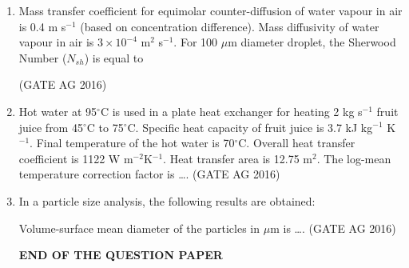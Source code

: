 \documentclass[journal]{IEEEtran}
\begin{document}
\begin{enumerate}
\item 
Mass transfer coefficient for equimolar counter-diffusion of water vapour in air is 0.4 m s$^{-1}$ (based on concentration difference). Mass diffusivity of water vapour in air is $3 \times 10^{-4}$ m$^2$ s$^{-1}$. For 100 $\mu$m diameter droplet, the Sherwood Number ($N_{sh}$) is equal to
\begin{enumerate}
\end{enumerate}
\hfill(GATE AG 2016)\\


\medskip

\item 
Hot water at 95$^\circ$C is used in a plate heat exchanger for heating 2 kg s$^{-1}$ fruit juice from 45$^\circ$C to 75$^\circ$C. Specific heat capacity of fruit juice is 3.7 kJ kg$^{-1}$ K$^{-1}$. Final temperature of the hot water is 70$^\circ$C. Overall heat transfer coefficient is 1122 W m$^{-2}$K$^{-1}$. Heat transfer area is 12.75 m$^2$. The log-mean temperature correction factor is \dots.
\hfill(GATE AG 2016)\\


\item 
In a particle size analysis, the following results are obtained:



Volume-surface mean diameter of the particles in $\mu$m is \dots.
\hfill(GATE AG 2016)\\


\begin{center}
\textbf{END OF THE QUESTION PAPER}
\end{center}

\end{enumerate}
\end{document}
